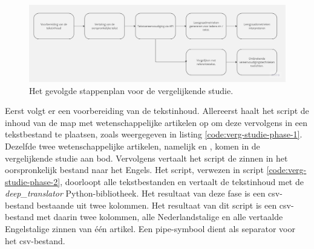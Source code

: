 \begin{figure}
\includegraphics[width=\linewidth]{img/flowchart-vergelijkende-studie.jpg}
\caption{Het gevolgde stappenplan voor de vergelijkende studie.}
\label{img:flowchart-vergelijkende-studie-metrics}
\end{figure}

\medspace

Eerst volgt er een voorbereiding van de tekstinhoud. Allereerst haalt het script de inhoud van de map met wetenschappelijke artikelen op om deze vervolgens in een tekstbestand te plaatsen, zoals weergegeven in listing \ref{code:verg-studie-phase-1}. Dezelfde twee wetenschappelijke artikelen, namelijk \textcite{Sleuwaegen2022} en \textcite{VanBrakel2022}, komen in de vergelijkende studie aan bod. Vervolgens vertaalt het script de zinnen in het oorspronkelijk bestand naar het Engels. Het script, verwezen in script \ref{code:verg-studie-phase-2}, doorloopt alle tekstbestanden en vertaalt de tekstinhoud met de \textit{deep\_translator} Python-bibliotheek. Het resultaat van deze fase is een csv-bestand bestaande uit twee kolommen. Het resultaat van dit script is een csv-bestand met daarin twee kolommen, alle Nederlandstalige en alle vertaalde Engelstalige zinnen van één artikel. Een pipe-symbool dient als separator voor het csv-bestand.

\medspace

